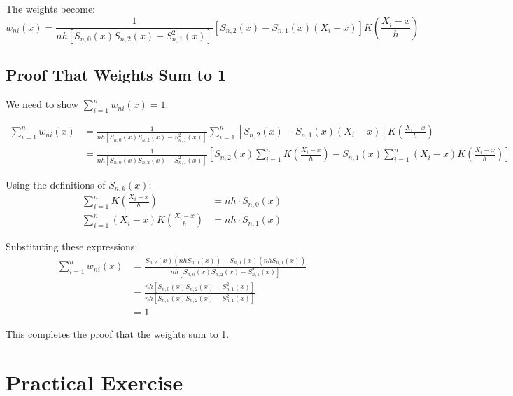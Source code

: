 \documentclass{article}
\begin{document}
\noindent The weights become:
\[
w_{ni}(x) = \frac{1}{nh[S_{n,0}(x)S_{n,2}(x) - S_{n,1}^2(x)]} \left[S_{n,2}(x) - S_{n,1}(x)(X_i - x)\right] K\left(\frac{X_i - x}{h}\right)
\]

\subsection{Proof That Weights Sum to 1}

We need to show $\sum_{i=1}^n w_{ni}(x) = 1$.

\begin{align*}
\sum_{i=1}^n w_{ni}(x) &= \frac{1}{nh[S_{n,0}(x)S_{n,2}(x) - S_{n,1}^2(x)]} \sum_{i=1}^n \left[S_{n,2}(x) - S_{n,1}(x)(X_i - x)\right] K\left(\frac{X_i - x}{h}\right) \\
&= \frac{1}{nh[S_{n,0}(x)S_{n,2}(x) - S_{n,1}^2(x)]} \left[S_{n,2}(x) \sum_{i=1}^n K\left(\frac{X_i - x}{h}\right) - S_{n,1}(x) \sum_{i=1}^n (X_i - x)K\left(\frac{X_i - x}{h}\right)\right]
\end{align*}

\noindent Using the definitions of $S_{n,k}(x)$:
\begin{align*}
\sum_{i=1}^n K\left(\frac{X_i - x}{h}\right) &= nh \cdot S_{n,0}(x) \\
\sum_{i=1}^n (X_i - x)K\left(\frac{X_i - x}{h}\right) &= nh \cdot S_{n,1}(x)
\end{align*}

\noindent Substituting these expressions:
\begin{align*}
\sum_{i=1}^n w_{ni}(x) &= \frac{S_{n,2}(x)(nh S_{n,0}(x)) - S_{n,1}(x)(nh S_{n,1}(x))}{nh[S_{n,0}(x)S_{n,2}(x) - S_{n,1}^2(x)]} \\
&= \frac{nh[S_{n,0}(x)S_{n,2}(x) - S_{n,1}^2(x)]}{nh[S_{n,0}(x)S_{n,2}(x) - S_{n,1}^2(x)]} \\
&= 1
\end{align*}

\noindent This completes the proof that the weights sum to 1.

\section{Practical Exercise}
\end{document}
